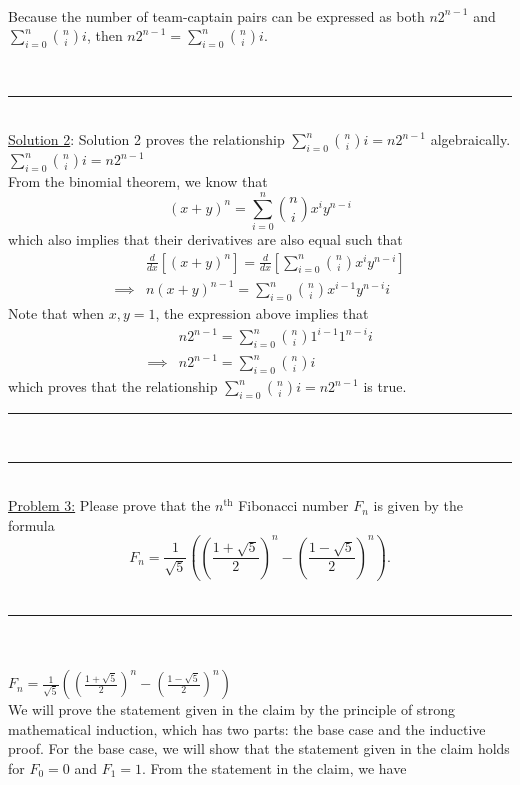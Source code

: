 \documentclass{article}
\newcommand{\problemsep}{\leavevmode\\[0.05in] \rule[\baselineskip/4]{\textwidth}{1pt} \\[0.005in] \rule[\baselineskip]{\textwidth}{1pt}\vspace{-\baselineskip/2}\leavevmode\\[0.05in]}
\newcommand{\statementsep}{\leavevmode\\[0.005in] \rule[\baselineskip/4]{\textwidth}{0.4pt}\leavevmode\\[0.005in]}
\begin{document}
\\[0.1in] \noindent Because the number of team-captain pairs can be expressed as both $n2^{n-1}$ and $\sum_{i=0}^n {n\choose i}i$, then $n2^{n-1} = \sum_{i=0}^n {n\choose i}i$.

\statementsep
\noindent\underline{Solution 2}: Solution 2 proves the relationship $\sum_{i= 0}^n\binom{n}{i}i = n2^{n-1}$ algebraically.
\\[0.05in]$\sum_{i= 0}^n\binom{n}{i}i = n2^{n-1}$
\\[0.05in] From the binomial theorem, we know that
\begin{equation*}
(x + y)^n = \sum_{i=0}^n {n \choose i} x^i y^{n - i}
\end{equation*}
which also implies that their derivatives are also equal such that
\begin{equation*}\begin{aligned}
         & \frac{d}{dx}\left [ (x + y)^n \right ] = \frac{d}{dx}\left [ \sum_{i=0}^n {n \choose i} x^i y^{n - i} \right ] \\
\implies & n(x + y)^{n-1}                               = \sum_{i=0}^n {n \choose i}x^{i-1}y^{n-i}i
\end{aligned}\end{equation*}
Note that when $x,y=1$, the expression above implies that
\begin{equation*}\begin{aligned}
& n2^{n-1} = \sum_{i=0}^n{n \choose i} 1^{i-1}1^{n-i}i \\
\implies & n2^{n-1} = \sum_{i=0}^n{n \choose i}i
\end{aligned}\end{equation*}
which proves that the relationship $\sum_{i= 0}^n\binom{n}{i}i = n2^{n-1}$ is true.
\problemsep
\noindent\underline{Problem 3:} Please prove that the $n^{\text{th}}$ Fibonacci number $F_n$ is given by the formula
\begin{equation*}
F_n = \frac{1}{\sqrt{5}}\left (\left ( \frac{1 + \sqrt{5}}{2} \right )^n - \left (\frac{1 - \sqrt{5}}{2} \right )^n \right ).
\end{equation*}
\statementsep
\\[0.05in] $F_n = \frac{1}{\sqrt{5}}\left (\left ( \frac{1 + \sqrt{5}}{2} \right )^n - \left (\frac{1 - \sqrt{5}}{2} \right )^n \right ) $
\\[0.05in] We will prove the statement given in the claim by the principle of strong mathematical induction, which has two parts: the base case and the inductive proof. For the base case, we will show that the statement given in the claim holds for $F_0 = 0$ and $F_1 = 1$. From the statement in the claim, we have 
\end{document}
